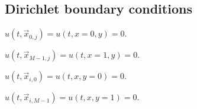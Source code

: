     \subsection*{Dirichlet boundary conditions}
        \begin{itemize*}
            \item[] $u(t, \vec{x}_{0,j})       = u(t, x\!=\!0, y) = 0$. \\
            \item[] $u(t, \vec{x}_{M\!-\!1,j}) = u(t, x\!=\!1, y) = 0$. \\
            \item[] $u(t, \vec{x}_{i,0})       = u(t, x, y\!=\!0) = 0$. \\
            \item[] $u(t, \vec{x}_{i,M\!-\!1}) = u(t, x, y\!=\!1) = 0$.
        \end{itemize*}

